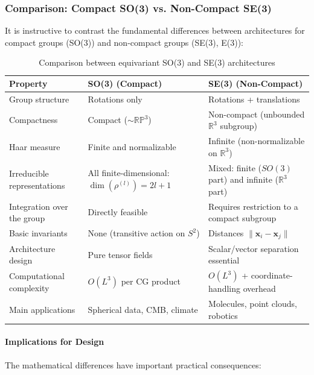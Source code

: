 \subsubsection{Comparison: Compact SO(3) vs. Non-Compact SE(3)}\label{subsubsec:so3_vs_se3_comparison}

It is instructive to contrast the fundamental differences between architectures for compact groups (SO(3)) and non-compact groups (SE(3), E(3)):

\begin{table}[h]
\centering
\begin{tabular}{|p{}|p{}|p{}|}
\hline
\textbf{Property} & \textbf{SO(3) (Compact)} & \textbf{SE(3) (Non-Compact)} \\
\hline
Group structure & Rotations only & Rotations + translations \\
\hline
Compactness & Compact ($\sim \mathbb{RP}^3$) & Non-compact (unbounded $\mathbb{R}^3$ subgroup) \\
\hline
Haar measure & Finite and normalizable & Infinite (non-normalizable on $\mathbb{R}^3$) \\
\hline
Irreducible representations & All finite-dimensional: $\dim(\rho^{(l)}) = 2l+1$ & Mixed: finite ($SO(3)$ part) and infinite ($\mathbb{R}^3$ part) \\
\hline
Integration over the group & Directly feasible & Requires restriction to a compact subgroup \\
\hline
Basic invariants & None (transitive action on $S^2$) & Distances $\|\mathbf{x}_i - \mathbf{x}_j\|$ \\
\hline
Architecture design & Pure tensor fields & Scalar/vector separation essential \\
\hline
Computational complexity & $O(L^3)$ per CG product & $O(L^3)$ + coordinate-handling overhead \\
\hline
Main applications & Spherical data, CMB, climate & Molecules, point clouds, robotics \\
\hline
\end{tabular}
\caption{Comparison between equivariant SO(3) and SE(3) architectures}
\label{tab:so3_vs_se3}
\end{table}

\paragraph{Implications for Design}

The mathematical differences have important practical consequences:

